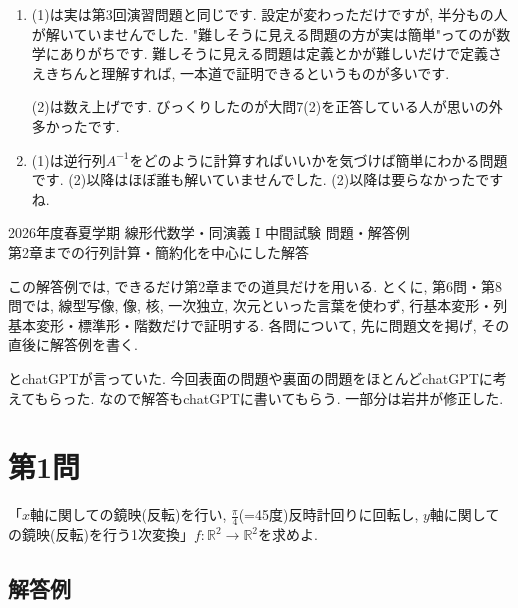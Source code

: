 \documentclass[uplatex,dvipdfmx,a4paper,14pt]{jsarticle}
\newcommand{\R}{\mathbb{R}}
\begin{document}
\begin{enumerate}[label={\textbf{第}\arabic*\textbf{問}.}]
(3)は簡単です. $A=E_2$を単位行列にして$B$をランク1の行列を持ってくればいいです. 
\item (1)は実は第3回演習問題と同じです. 設定が変わっただけですが, 半分もの人が解いていませんでした. 
 "難しそうに見える問題の方が実は簡単"ってのが数学にありがちです. 難しそうに見える問題は定義とかが難しいだけで定義さえきちんと理解すれば, 一本道で証明できるというものが多いです. 

(2)は数え上げです. びっくりしたのが大問7(2)を正答している人が思いの外多かったです. 
\item (1)は逆行列$A^{-1}$をどのように計算すればいいかを気づけば簡単にわかる問題です. (2)以降はほぼ誰も解いていませんでした. (2)以降は要らなかったですね. 
\end{enumerate}
\newpage

\begin{center}
{\Large 2026年度春夏学期 線形代数学・同演義 I 中間試験 問題・解答例}\\[2mm]
{\large 第2章までの行列計算・簡約化を中心にした解答}\\[1mm]
\end{center}

\begin{tcolorbox}[notestyle,title=方針]
この解答例では, できるだけ第2章までの道具だけを用いる. とくに, 第6問・第8問では, 線型写像, 像, 核, 一次独立, 次元といった言葉を使わず, 行基本変形・列基本変形・標準形・階数だけで証明する. 各問について, 先に問題文を掲げ, その直後に解答例を書く.
\end{tcolorbox}

とchatGPTが言っていた. 
今回表面の問題や裏面の問題をほとんどchatGPTに考えてもらった. 
なので解答もchatGPTに書いてもらう. 
一部分は岩井が修正した. 

\section*{第1問}

\begin{tcolorbox}[problemstyle,title=問題]

「$x$軸に関しての鏡映(反転)を行い, $\frac{\pi}{4}$(=45度)反時計回りに回転し, $y$軸に関しての鏡映(反転)を行う1次変換」$f: \R^2 \to \R^2$を求めよ.

\end{tcolorbox}

\subsection*{解答例}
\end{document}
